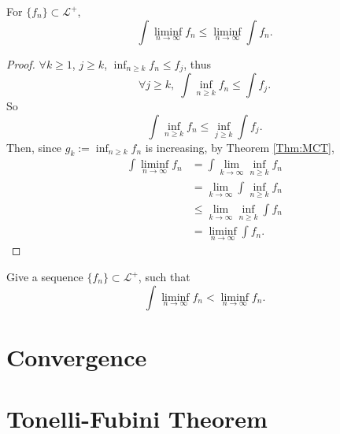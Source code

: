 \begin{thm}
    \label{Thm:Fatou}
    For $\{f_{n}\}\subset\mathcal{L}^{+}$, 
    \begin{displaymath}
        \int\liminf_{n\rightarrow\infty}f_n\le\liminf_{n\rightarrow\infty}
        \int f_n.
    \end{displaymath}
\end{thm}
\begin{proof}
    $\forall k\ge 1$, $j\ge k$, $\inf_{n\ge k}f_n\le f_{j}$, 
    thus 
    \begin{displaymath}
        \forall j\ge k,\;
        \int\inf_{n\ge k}f_n\le\int f_{j}.
    \end{displaymath} 
    So 
    \begin{displaymath}
        \int\inf_{n\ge k}f_n\le\inf_{j\ge k}\int f_{j}.
    \end{displaymath}
    Then, since $g_{k}:=\inf_{n\ge k}f_{n}$ is increasing, 
    by Theorem \ref{Thm:MCT}, 
    \begin{displaymath}
        \begin{array}{rl}
        \int\liminf_{n\rightarrow\infty}f_{n}
        &=\int\lim_{k\rightarrow\infty}\inf_{n\ge k}f_{n}\\
        &=\lim_{k\rightarrow\infty}\int\inf_{n\ge k}f_{n}\\
        &\le\lim_{k\rightarrow\infty}\inf_{n\ge k}\int f_{n}\\
        &=\liminf_{n\rightarrow\infty}\int f_{n}.
        \end{array}
    \end{displaymath}
\end{proof}
\begin{exc}
    Give a sequence $\{f_{n}\}\subset\mathcal{L}^{+}$, 
    such that 
    \begin{displaymath}
        \int\liminf_{n\rightarrow\infty}f_{n}<\liminf_{n\rightarrow\infty}f_{n}.
    \end{displaymath}
\end{exc}
\section{Convergence}
\section{Tonelli-Fubini Theorem}